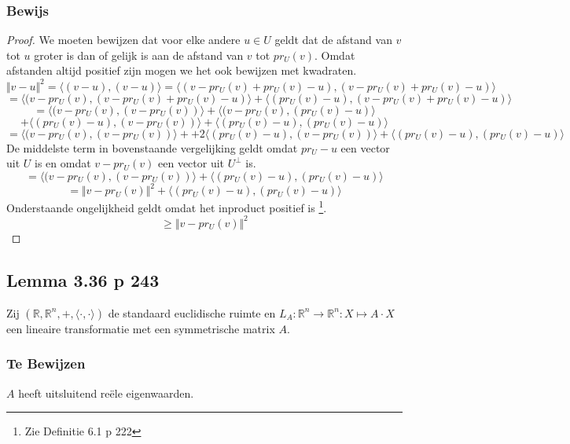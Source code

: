 \documentclass[lineaire_algebra_oplossingen.tex]{subfiles}
\begin{document}
\subsubsection*{Bewijs}
\begin{proof}
We moeten bewijzen dat voor elke andere $u\in U$ geldt dat de afstand van $v$ tot $u$ groter is dan of gelijk is aan de afstand van $v$ tot $pr_U(v)$. Omdat afstanden altijd positief zijn mogen we het ook bewijzen met kwadraten.
\[
\Vert v- u \Vert^2 = \langle (v-u) , (v-u)\rangle = \langle (v-pr_U(v)+pr_U(v)-u) , (v-pr_U(v)+pr_U(v)-u)\rangle
\]
\[
= \langle (v-pr_U(v), (v-pr_U(v)+pr_U(v)-u)\rangle + \langle (pr_U(v)-u) , (v-pr_U(v)+pr_U(v)-u)\rangle
\]
\[
= \langle (v-pr_U(v), (v-pr_U(v))\rangle + \langle (v-pr_U(v), (pr_U(v)-u)\rangle\]\[ +\langle (pr_U(v)-u) , (v-pr_U(v))\rangle + \langle (pr_U(v)-u) , (pr_U(v)-u)\rangle
\]
\[
= \langle (v-pr_U(v), (v-pr_U(v))\rangle + +2\langle (pr_U(v)-u) , (v-pr_U(v))\rangle + \langle (pr_U(v)-u) , (pr_U(v)-u)\rangle
\]
De middelste term in bovenstaande vergelijking geldt omdat $pr_U-u$ een vector uit $U$ is en omdat $v-pr_U(v)$ een vector uit $U^\bot$ is.
\[
 = \langle (v-pr_U(v), (v-pr_U(v))\rangle + \langle (pr_U(v)-u) , (pr_U(v)-u)\rangle
\]
\[
= \Vert v-pr_U(v) \Vert^2 + \langle (pr_U(v)-u) , (pr_U(v)-u)\rangle
\]
Onderstaande ongelijkheid geldt omdat het inproduct positief is \footnote{Zie Definitie 6.1 p 222}.
\[
\ge \Vert v-pr_U(v) \Vert^2
\]
\end{proof}


\subsection{Lemma 3.36 p 243}
\label{6.36}
Zij $(\mathbb{R},\mathbb{R}^n,+,\langle \cdot , \cdot \rangle)$ de standaard euclidische ruimte en $L_A : \mathbb{R}^n \rightarrow \mathbb{R}^n: X \mapsto A \cdot X$ een lineaire transformatie met een symmetrische matrix $A$.

\subsubsection*{Te Bewijzen}
$A$ heeft uitsluitend re\"ele eigenwaarden.
\end{document}
